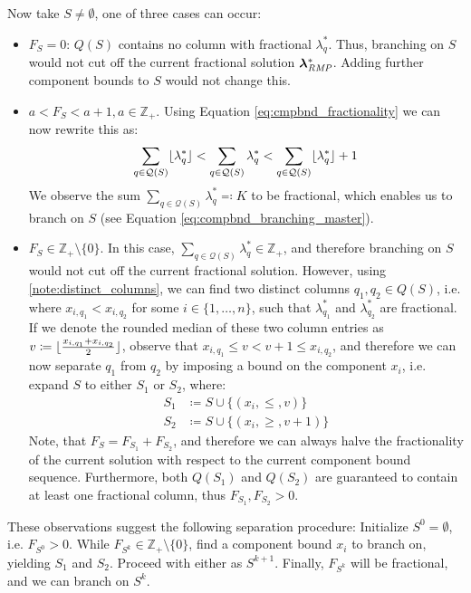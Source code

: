 Now take $S \neq \emptyset$, one of three cases can occur:
\begin{itemize}
\item	$F_S = 0$: $Q(S)$ contains no column with fractional $\lambda_q^*$. Thus, branching on $S$ would not cut off the current fractional solution ${\bm{\lambda}}^*_{\textit{RMP}}{}$. Adding further component bounds to $S$ would not change this.
\item	$a < F_S < a + 1, a \in \mathbb{Z}_+$. Using Equation \eqref{eq:cmpbnd_fractionality} we can now rewrite this as:
		\begin{equation}
		\sum_{q \in \mathcal{Q}(S)} \lfloor\lambda_q^*\rfloor < \sum_{q \in \mathcal{Q}(S)} \lambda_q^* < \sum_{q \in \mathcal{Q}(S)} \lfloor\lambda_q^*\rfloor + 1
		\end{equation}
		We observe the sum $\sum_{q \in \mathcal{Q}(S)} \lambda_q^* \eqcolon K$ to be fractional, which enables us to branch on $S$ (see Equation \eqref{eq:compbnd_branching_master}).
\item	$F_S \in \mathbb{Z}_+ \setminus \{0\}$. In this case, $\sum_{q \in \mathcal{Q}(S)} \lambda_q^* \in \mathbb{Z}_+$, and therefore branching on $S$ would not cut off the current fractional solution. However, using \ref{note:distinct_columns}, we can find two distinct columns $q_1, q_2 \in Q(S)$, i.e. where $x_{i,q_1} < x_{i,q_2}$ for some $i \in \{1, \dots, n\}$, such that $\lambda_{q_1}^*$ and $\lambda_{q_2}^*$ are fractional. If we denote the rounded median of these two column entries as $v \coloneqq \lfloor\frac{x_{i,q_1} + x_{i,q_2}}{2}\rfloor$, observe that $x_{i,q_1} \leq v < v + 1 \leq x_{i,q_2}$, and therefore we can now separate $q_1$ from $q_2$ by imposing a bound on the component $x_i$, i.e. expand $S$ to either $S_1$ or $S_2$, where:
		\begin{equation}
		\begin{aligned}
		S_1 &\coloneqq S \cup \{\left( x_i, \leq, v \right)\}\\
		S_2 &\coloneqq S \cup \{\left( x_i, \geq, v + 1 \right)\}
		\end{aligned}
		\end{equation}
		Note, that $F_S = F_{S_1} + F_{S_2}$, and therefore we can always halve the fractionality of the current solution with respect to the current component bound sequence. Furthermore, both $Q(S_1)$ and $Q(S_2)$ are guaranteed to contain at least one fractional column, thus $F_{S_1}, F_{S_2} > 0$.
\end{itemize}

These observations suggest the following separation procedure: Initialize $S^0 = \emptyset$, i.e. $F_{S^0} > 0$. While $F_{S^k} \in \mathbb{Z}_+ \setminus \{0\}$, find a component bound $x_i$ to branch on, yielding $S_1$ and $S_2$. Proceed with either as $S^{k+1}$. Finally, $F_{S^k}$ will be fractional, and we can branch on $S^k$.


